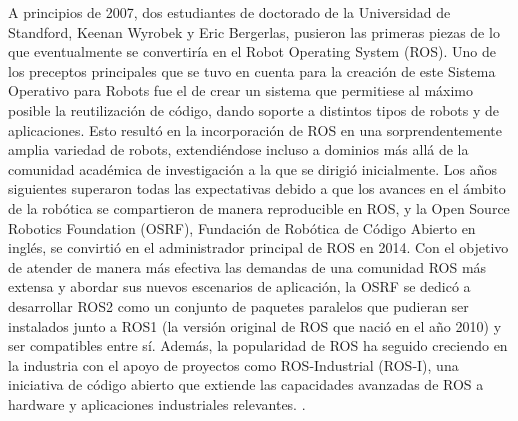 A principios de 2007, dos estudiantes de doctorado de la Universidad de Standford, Keenan Wyrobek y Eric Bergerlas, pusieron las primeras piezas de lo que eventualmente se convertiría en el Robot Operating System (ROS). Uno de los preceptos principales que se tuvo en cuenta para la creación de este Sistema Operativo para Robots fue el de crear un sistema que permitiese al máximo posible la reutilización de código, dando soporte a distintos tipos de robots y de aplicaciones. Esto resultó en la incorporación de ROS en una sorprendentemente amplia variedad de robots, extendiéndose incluso a dominios más allá de la comunidad académica de investigación a la que se dirigió inicialmente. Los años siguientes superaron todas las expectativas debido a que los avances en el ámbito de la robótica se compartieron de manera reproducible en ROS, y la Open Source Robotics Foundation (OSRF), Fundación de Robótica de Código Abierto en inglés, se convirtió en el administrador principal de ROS en 2014. Con el objetivo de atender de manera más efectiva las demandas de una comunidad ROS más extensa y abordar sus nuevos escenarios de aplicación, la OSRF se dedicó a desarrollar ROS2 como un conjunto de paquetes paralelos que pudieran ser instalados junto a ROS1 (la versión original de ROS que nació en el año 2010) y ser compatibles entre sí. Además, la popularidad de ROS ha seguido creciendo en la industria con el apoyo de proyectos como ROS-Industrial (ROS-I), una iniciativa de código abierto que extiende las capacidades avanzadas de ROS a hardware y aplicaciones industriales relevantes. \cite{Suarez22}.\\
  
